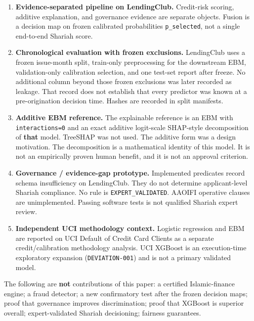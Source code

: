 \documentclass{ieeeaccess}
\begin{document}
\begin{enumerate}
\item \textbf{Evidence-separated pipeline on LendingClub.} Credit-risk scoring, additive explanation, and governance evidence are separate objects. Fusion is a decision map on frozen calibrated probabilities \texttt{p\_selected}, not a single end-to-end Shariah score.

\item \textbf{Chronological evaluation with frozen exclusions.} LendingClub uses a frozen issue-month split, train-only preprocessing for the downstream EBM, validation-only calibration selection, and one test-set report after freeze. No additional column beyond those frozen exclusions was later recorded as leakage. That record does not establish that every predictor was known at a pre-origination decision time. Hashes are recorded in split manifests.

\item \textbf{Additive EBM reference.} The explainable reference is an EBM with \texttt{interactions=0} and an exact additive logit-scale SHAP-style decomposition of \textbf{that} model. TreeSHAP was not used. The additive form was a design motivation. The decomposition is a mathematical identity of this model. It is not an empirically proven human benefit, and it is not an approval criterion.

\item \textbf{Governance / evidence-gap prototype.} Implemented predicates record schema insufficiency on LendingClub. They do not determine applicant-level Shariah compliance. No rule is \texttt{EXPERT\_VALIDATED}. AAOIFI operative clauses are unimplemented. Passing software tests is not qualified Shariah expert review.

\item \textbf{Independent UCI methodology context.} Logistic regression and EBM are reported on UCI Default of Credit Card Clients as a separate credit/calibration methodology analysis. UCI XGBoost is an execution-time exploratory expansion (\texttt{DEVIATION-001}) and is not a primary validated model.

\end{enumerate}
The following are \textbf{not} contributions of this paper: a certified Islamic-finance engine; a fraud detector; a new confirmatory test after the frozen decision maps; proof that governance improves discrimination; proof that XGBoost is superior overall; expert-validated Shariah decisioning; fairness guarantees.
\end{document}

